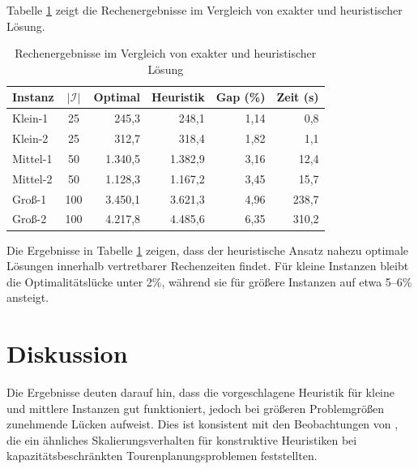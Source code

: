 \documentclass[11pt,a4paper]{article}
\begin{document}
Tabelle \ref{tab:ergebnisse} zeigt die Rechenergebnisse im Vergleich von exakter und heuristischer Lösung.
\begin{table}[H]
	\centering
	\caption{Rechenergebnisse im Vergleich von exakter und heuristischer Lösung}
	\label{tab:ergebnisse}
	\begin{tabular}{lcrrrr}
		\toprule
		Instanz & $|\mathcal{I}|$ & Optimal & Heuristik & Gap (\%) & Zeit (s)\\
		\midrule
		Klein-1  & 25  &   245,3 &   248,1 & 1,14 &    0,8\\
		Klein-2  & 25  &   312,7 &   318,4 & 1,82 &    1,1\\
		Mittel-1 & 50  & 1.340,5 & 1.382,9 & 3,16 &   12,4\\
		Mittel-2 & 50  & 1.128,3 & 1.167,2 & 3,45 &   15,7\\
		Groß-1   & 100 & 3.450,1 & 3.621,3 & 4,96 &  238,7\\
		Groß-2   & 100 & 4.217,8 & 4.485,6 & 6,35 &  310,2\\
		\bottomrule
	\end{tabular}
\end{table}

Die Ergebnisse in Tabelle \ref{tab:ergebnisse} zeigen, dass der heuristische Ansatz nahezu optimale Lösungen innerhalb vertretbarer Rechenzeiten findet. Für kleine Instanzen bleibt die Optimalitätslücke unter 2\%, während sie für größere Instanzen auf etwa 5--6\% ansteigt.

\section{Diskussion}
\label{sec:diskussion}
Die Ergebnisse deuten darauf hin, dass die vorgeschlagene Heuristik für kleine und mittlere Instanzen gut funktioniert, jedoch bei größeren Problemgrößen zunehmende Lücken aufweist. Dies ist konsistent mit den Beobachtungen von \textcite{toth2014vehicle}, die ein ähnliches Skalierungsverhalten für konstruktive Heuristiken bei kapazitätsbeschränkten Tourenplanungsproblemen feststellten.
\end{document}
